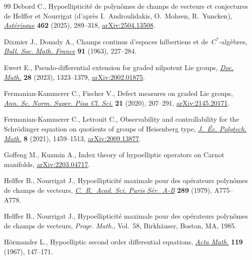 \documentclass[10pt,a4paper]{article}
\numberwithin{equation}{section}
\theoremstyle{definition}
\begin{document}
\begin{thebibliography}{99}
Debord C., Hypoellipticit\'e de polyn\^omes de champs de vecteurs et
 conjectures de {H}elffer et {N}ourrigat (d'apr\`es {I}.~{A}ndroulidakis, {O}.~{M}ohsen, {R}.~{Y}uncken), \href{https://doi.org/10.24033/ast.1261}{\textit{Ast\'erisque}} \textbf{462} (2025), 289--318,
 \href{https://arxiv.org/abs/2504.13508}{arXiv:2504.13508}.

Dixmier J., Douady A., Champs continus d'espaces hilbertiens et de~{$C^{\ast}
 $}-alg\`ebres, \href{https://doi.org/10.24033/bsmf.1596}{\textit{Bull. Soc.
 Math. France}} \textbf{91} (1963), 227--284.

Ewert E., Pseudo-differential extension for graded nilpotent {L}ie groups,
 \href{https://doi.org/10.4171/dm/940}{\textit{Doc. Math.}} \textbf{28}
 (2023), 1323--1379,
 \href{https://arxiv.org/abs/2002.01875}{arXiv:2002.01875}.

Fermanian-Kammerer C., Fischer V., Defect measures on graded {L}ie groups,
 \href{https://doi.org/10.2422/2036-2145.201711_011}{\textit{Ann. Sc. Norm.
 Super. Pisa Cl. Sci.}} \textbf{21} (2020), 207--291,
 \href{https://arxiv.org/abs/2145.20171}{arXiv:2145.20171}.

Fermanian-Kammerer C., Letrouit C., Observability and controllability for the
 {S}chr\"odinger equation on quotients of groups of {H}eisenberg type,
 \href{https://doi.org/10.5802/jep.176}{\textit{J.~\'Ec. Polytech. Math.}}
 \textbf{8} (2021), 1459--1513,
 \href{https://arxiv.org/abs/2009.13877}{arXiv:2009.13877}.

Goffeng M., Kuzmin A., Index theory of hypoelliptic operators on {C}arnot
 manifolds, \href{https://arxiv.org/abs/2203.04717}{arXiv:2203.04717}.

Helffer B., Nourrigat J., Hypoellipticit\'e maximale pour des op\'erateurs
 polyn\^omes de champs de vecteurs,
 \href{https://doi.org/10.5802/jedp.206}{\textit{C.~R.~Acad. Sci. Paris
 S\'er.~A-B}} \textbf{289} (1979), A775--A778.

Helffer B., Nourrigat J., Hypoellipticit\'e maximale pour des op\'erateurs
 polyn\^omes de champs de vecteurs, \textit{Progr. Math.}, Vol.~58,
 Birkh\"auser, Boston, MA, 1985.

H\"ormander L., Hypoelliptic second order differential equations,
 \href{https://doi.org/10.1007/BF02392081}{\textit{Acta Math.}} \textbf{119}
 (1967), 147--171.


\end{thebibliography}
\end{document}
